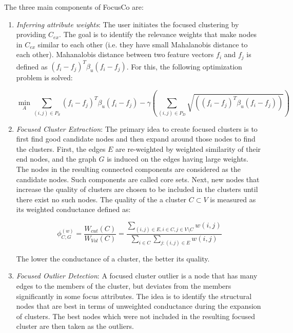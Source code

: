 \documentclass[11pt, oneside]{article}   	%
\begin{document}
\quad The three main components of FocusCo are:
\begin{enumerate}
\item \emph{Inferring attribute weights}: 
The user initiates the focused clustering by providing $C_{ex}$.
The goal is to identify the relevance weights that make nodes in $C_{ex}$ similar to each other (i.e. they have small Mahalanobis distance to each other).
Mahanalobis distance between two feature vectors $f_i$ and $f_j$ is defined as $(f_i - f_j)^T\beta_u(f_i-f_j)$. For this, the following optimization problem is solved:

\begin{equation*}
\min_{A} \sum_{(i,j) \in P_S}(f_i - f_j)^T\beta_u(f_i-f_j) - \gamma \left( \sum_{(i,j) \in P_D} \sqrt{((f_i - f_j)^T\beta_u(f_i-f_j))} \right)
\end{equation*}  

\item \emph{Focused Cluster Extraction}: 
The primary idea to create focused clusters is to first find good candidate nodes and then expand around those nodes to find the clusters.
First, the edges $E$ are re-weighted by weighted similarity of their end nodes, and the graph $G$ is induced on the edges having large weights.
The nodes in the resulting connected components are considered as the candidate nodes. Such components are called core sets.
Next, new nodes that increase the quality of clusters are chosen to be included in the clusters until there exist no such nodes.
The quality of the a cluster $C \subset V$ is measured as its weighted conductance defined as:

\begin{equation*}
\phi^{(w)}_{C, G} = \frac{W_{cut}(C)}{W_{Vol}(C)} = \frac {\sum\limits_{(i,j)\in E, i\in C, j\in V\setminus C}w(i,j)} 
														  {\sum\limits_{i\in C} \sum\limits_{j:(i,j)\in E}w(i,j)}
\end{equation*}

The lower the conductance of a cluster, the better its quality.

\item \emph{Focused Outlier Detection}:
A focused cluster outlier is a node that has many edges to the members of the cluster, but deviates from the members significantly in some focus attributes.
The idea is to identify the structural nodes that are best in terms of unweighted conductance during the expansion of clusters.
The best nodes which were not included in the resulting focused cluster are then taken as the outliers.
\end{enumerate}
\end{document}
